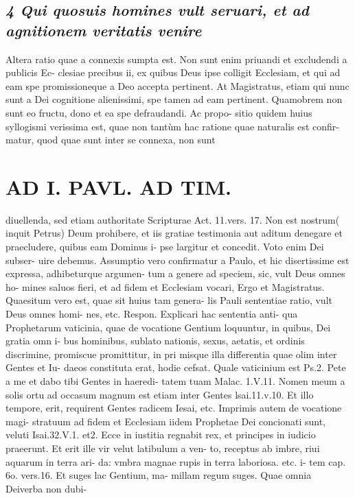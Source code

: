\documentclass{article}
\begin{document}
\begin{pages}
\subsection*{\textit{4 Qui quosuis homines vult seruari, et ad agnitionem veritatis venire }}\pstart Altera ratio quae a connexis sumpta est. Non sunt enim priuandi et excludendi a publicis Ec- clesiae precibus ii, ex quibus Deus ipse colligit Ecclesiam, et qui ad eam spe promissioneque a Deo accepta pertinent. At Magistratus, etiam qui nunc sunt a Dei cognitione alienissimi, spe tamen ad eam pertinent. Quamobrem non sunt eo fructu, dono et ea spe defraudandi. Ac propo- sitio quidem huius syllogismi verissima est, quae non tantùm hac ratione quae naturalis est confir- matur, quod quae sunt inter se connexa, non sunt  \pend
\section*{AD I. PAVL. AD TIM. }
\marginpar{[ p.52 ]}\pstart diuellenda, sed etiam authoritate Scripturae Act. 11.vers. 17. Non est nostrum( inquit Petrus) Deum prohibere, et iis gratiae testimonia aut aditum denegare et praecludere, quibus eam Dominus i- pse largitur et concedit. Voto enim Dei subser- uire debemus.  \pend\pstart Assumptio vero confirmatur a Paulo, et hic disertissime est expressa, adhibeturque argumen- tum a genere ad speciem, sic, vult Deus omnes ho- mines saluos fieri, et ad fidem et Ecclesiam vocari, Ergo et Magistratus.  \pend\pstart Quaesitum vero est, quae sit huius tam genera- lis Pauli sententiae ratio, vult Deus omnes homi- nes, etc. Respon. Explicari hac sententia anti- qua Prophetarum vaticinia, quae de vocatione Gentium loquuntur, in quibus, Dei gratia omn i- bus hominibus, sublato nationis, sexus, aetatis, et ordinis discrimine, promiscue promittitur, in pri misque  illa differentia quae olim inter Gentes et Iu- daeos constituta erat, hodie cefsat. Quale vaticinium est Ps.2. Pete a me et dabo tibi Gentes in haeredi- tatem tuam Malac. 1.V.11. Nomen meum a solis ortu ad occasum magnum est etiam inter Gentes lsai.11.v.10. Et illo tempore, erit, requirent Gentes radicem Iesai, etc. Imprimis autem de vocatione magi- stratuum ad fidem et Ecclesiam iidem Prophetae Dei concionati sunt, veluti Isai.32.V.1. et2. Ecce in iustitia regnabit rex, et principes in iudicio praeerunt. Et erit ille vir velut latibulum a ven- to, receptus ab imbre, riui aquarum in terra ari- da: vmbra magnae rupis in terra laboriosa. etc. i- tem cap. 6o. vers.16. Et suges lac Gentium, ma- millam regum suges. Quae omnia Deiverba non dubi-  \pend

\end{pages}
\end{document}
